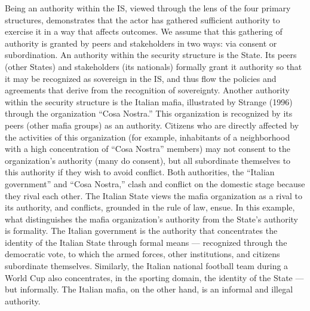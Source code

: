 Being an authority within the IS, viewed through the lens of the four primary structures, demonstrates that the actor has gathered sufficient authority to exercise it in a way that affects outcomes. We assume that this gathering of authority is granted by peers and stakeholders in two ways: via consent or subordination. An authority within the security structure is the State. Its peers (other States) and stakeholders (its nationals) formally grant it authority so that it may be recognized as sovereign in the IS, and thus flow the policies and agreements that derive from the recognition of sovereignty. Another authority within the security structure is the Italian mafia, illustrated by Strange (1996) through the organization ``Cosa Nostra.'' This organization is recognized by its peers (other mafia groups) as an authority. Citizens who are directly affected by the activities of this organization (for example, inhabitants of a neighborhood with a high concentration of ``Cosa Nostra'' members) may not consent to the organization's authority (many do consent), but all subordinate themselves to this authority if they wish to avoid conflict. Both authorities, the ``Italian government'' and ``Cosa Nostra,'' clash and conflict on the domestic stage because they rival each other. The Italian State views the mafia organization as a rival to its authority, and conflicts, grounded in the rule of law, ensue. In this example, what distinguishes the mafia organization's authority from the State's authority is formality. The Italian government is the authority that concentrates the identity of the Italian State through formal means --- recognized through the democratic vote, to which the armed forces, other institutions, and citizens subordinate themselves. Similarly, the Italian national football team during a World Cup also concentrates, in the sporting domain, the identity of the State --- but informally. The Italian mafia, on the other hand, is an informal and illegal authority.

